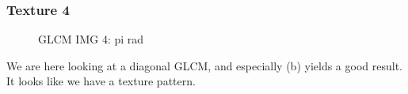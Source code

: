 \documentclass{article}
\begin{document}
	\subsubsection{Texture 4}
		\begin{figure}[h]%
			\centering
    		\qquad
    		\qquad
    		\qquad

    		\caption{GLCM IMG 4: pi rad}%
    		\label{fig:GLCM_4}%
		\end{figure}
		We are here looking at a diagonal GLCM, and especially (b) yields a good result. It looks like we have a texture pattern.		
		
\end{document}

